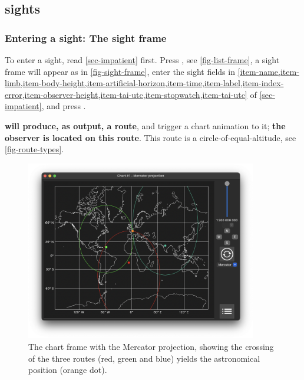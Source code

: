 \documentclass{ol-softwaremanual}
\begin{document}
\subsection{\Glspl{sight}}

\subsubsection{Entering a \gls{sight}: The \gls{sight} frame}

To enter a  \gls{sight}, read  \cref{sec-impatient}  first.  Press  , see \cref{fig-list-frame}, a \gls{sight} frame will appear as in \cref{fig-sight-frame}, enter the \gls{sight} fields in  \cref{item-name,item-limb,item-body-height,item-artificial-horizon,item-time,item-label,item-index-error,item-observer-height,item-tai-utc,item-stopwatch,item-tai-utc} of \cref{sec-impatient}, and press .

\textbf{\thel will produce, as output, a \gls{route}}, and trigger a chart animation to it; \textbf{the observer is located  on this route}. This \gls{route} is a \gls{circle-of-equal-altitude}, see \cref{fig-route-types}. 


\begin{figure}
  \centering
  \includegraphics[width=0.9\textwidth]{figures/astronomical-position-mercator.png}
  \caption{
    \label{fig-astronomical-position}
    The chart frame with the Mercator projection, showing the crossing of the three \glspl{route} (red, green and blue) yields the astronomical \gls{position} (orange dot).  
  }
\end{figure}
\end{document}
